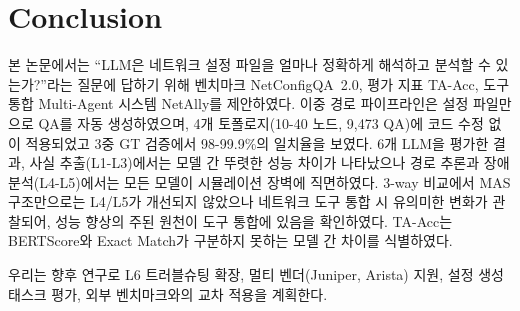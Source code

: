 
\section{Conclusion}
본 논문에서는 ``LLM은 네트워크 설정 파일을 얼마나 정확하게 해석하고 분석할 수 있는가?''라는 질문에 답하기 위해 벤치마크 NetConfigQA~2.0, 평가 지표 TA-Acc, 도구 통합 Multi-Agent 시스템 NetAlly를 제안하였다. 이중 경로 파이프라인은 설정 파일만으로 QA를 자동 생성하였으며, 4개 토폴로지(10-40 노드, 9,473 QA)에 코드 수정 없이 적용되었고 3중 GT 검증에서 98-99.9\%의 일치율을 보였다. 6개 LLM을 평가한 결과, 사실 추출(L1-L3)에서는 모델 간 뚜렷한 성능 차이가 나타났으나 경로 추론과 장애 분석(L4-L5)에서는 모든 모델이 시뮬레이션 장벽에 직면하였다. 3-way 비교에서 MAS 구조만으로는 L4/L5가 개선되지 않았으나 네트워크 도구 통합 시 유의미한 변화가 관찰되어, 성능 향상의 주된 원천이 도구 통합에 있음을 확인하였다. TA-Acc는 BERTScore와 Exact Match가 구분하지 못하는 모델 간 차이를 식별하였다.

우리는 향후 연구로 L6 트러블슈팅 확장, 멀티 벤더(Juniper, Arista) 지원, 설정 생성 태스크 평가, 외부 벤치마크와의 교차 적용을 계획한다.
